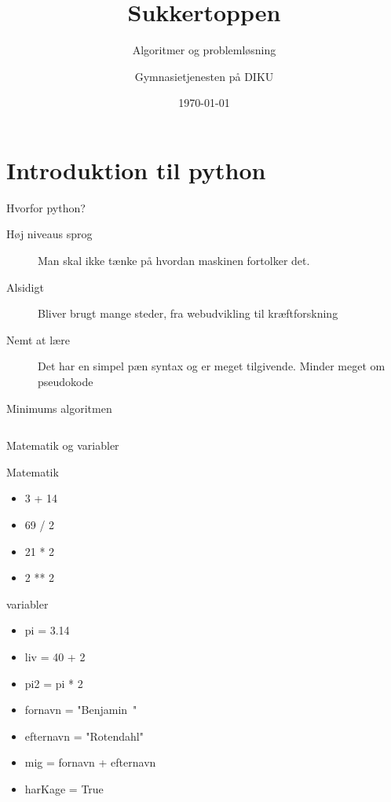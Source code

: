 \documentclass[12pt,t]{beamer}
\title{Sukkertoppen}
\subtitle{Algoritmer og problemløsning}
\author{
        Gymnasietjenesten på DIKU 
}
\date[]{\today}
\begin{document}
\frame[plain]{\titlepage}
 \frame{\tableofcontents}

 \section{Introduktion til python}
     \begin{frame}[t]{Hvorfor python?}
         \begin{description}
             \item[Høj niveaus sprog] Man skal ikke tænke på hvordan
             maskinen fortolker det.
             \pause
             \item[Alsidigt] Bliver brugt mange steder,
             fra webudvikling til kræftforskning
             \pause
             \item[Nemt at lære] Det har en simpel pæn syntax og er meget
             tilgivende. Minder meget om pseudokode
         \end{description}
         \pause
         \begin{block}{Minimums algoritmen}
               \inputminted{python}{min.py}
        \end{block}
     \end{frame}

     \begin{frame}{Matematik og variabler}
         \vspace{-1em}
         \begin{block}{Matematik}
            \begin{itemize}
                \item 3 + 14 \pause
                \item 69 / 2 \pause
                \item 21 * 2 \pause
                \item 2 ** 2
            \end{itemize}
         \end{block}
         \pause
         \begin{block}{variabler}
             \begin{itemize}
                 \item pi  = 3.14
                \pause \item liv = 40 + 2
                \pause \item pi2 = pi * 2
                \pause \item fornavn = "Benjamin~"
                \pause \item efternavn = "Rotendahl"
                \pause \item mig = fornavn + efternavn
                \pause \item harKage = True
             \end{itemize}
         \end{block}
     \end{frame}
\end{document}
